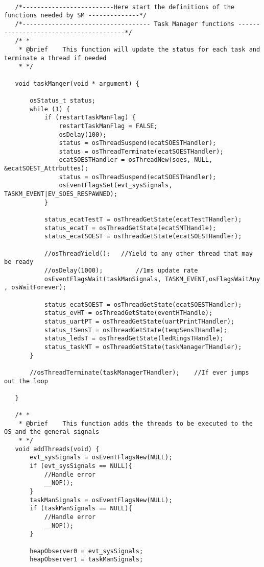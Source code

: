 \begin{lstlisting}[label=lst:generalSM,caption={Part of the code to declare threads and other auxiliar functions.}]
   
   /*-------------------------Here start the definitions of the functions needed by SM --------------*/
   /*----------------------------------- Task Manager functions ---------------------------------------*/
   /* *
    * @brief 	This function will update the status for each task and terminate a thread if needed
    * */
   
   void taskManger(void * argument) {
   
       osStatus_t status;
       while (1) {
           if (restartTaskManFlag) {
               restartTaskManFlag = FALSE;
               osDelay(100);
               status = osThreadSuspend(ecatSOESTHandler);
               status = osThreadTerminate(ecatSOESTHandler);
               ecatSOESTHandler = osThreadNew(soes, NULL, &ecatSOEST_Attrbuttes);
               status = osThreadSuspend(ecatSOESTHandler);
               osEventFlagsSet(evt_sysSignals, TASKM_EVENT|EV_SOES_RESPAWNED);
           }
   
           status_ecatTestT = osThreadGetState(ecatTestTHandler);
           status_ecatT = osThreadGetState(ecatSMTHandle);
           status_ecatSOEST = osThreadGetState(ecatSOESTHandler);
   
           //osThreadYield();	//Yield to any other thread that may be ready
           //osDelay(1000);			//1ms update rate
           osEventFlagsWait(taskManSignals, TASKM_EVENT,osFlagsWaitAny , osWaitForever);
   
           status_ecatSOEST = osThreadGetState(ecatSOESTHandler);
           status_evHT = osThreadGetState(eventHTHandle);
           status_uartPT = osThreadGetState(uartPrintTHandler);
           status_tSensT = osThreadGetState(tempSensTHandle);
           status_ledsT = osThreadGetState(ledRingsTHandle);
           status_taskMT = osThreadGetState(taskManagerTHandler);
       }
   
       //osThreadTerminate(taskManagerTHandler);	//If ever jumps out the loop
   
   }
   
   /* *
    * @brief	This function adds the threads to be executed to the OS and the general signals
    * */
   void addThreads(void) {
       evt_sysSignals = osEventFlagsNew(NULL);
       if (evt_sysSignals == NULL){
           //Handle error
           __NOP();
       }
       taskManSignals = osEventFlagsNew(NULL);
       if (taskManSignals == NULL){
           //Handle error
           __NOP();
       }
   
       heapObserver0 = evt_sysSignals;
       heapObserver1 = taskManSignals;
   

\end{lstlisting}
